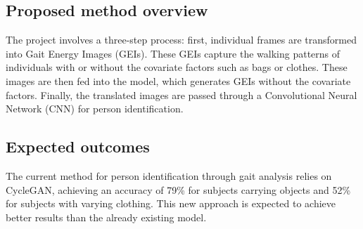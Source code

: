 \documentclass[12pt,a4paper]{article}
\begin{document}
\subsection{Proposed method overview}
The project involves a three-step process: first, individual frames are transformed into Gait Energy Images (GEIs). These GEIs capture the walking patterns of individuals with or without the covariate factors such as bags or clothes. These images are then fed into the model, which generates GEIs without the covariate factors. Finally, the translated images are passed through a Convolutional Neural Network (CNN) for person identification.

\subsection{Expected outcomes}
 The current method for person identification through gait analysis relies on CycleGAN, achieving an accuracy of 79\% for subjects carrying objects and 52\% for subjects with varying clothing. This new approach is expected to achieve better results than the already existing model.



\end{document}
